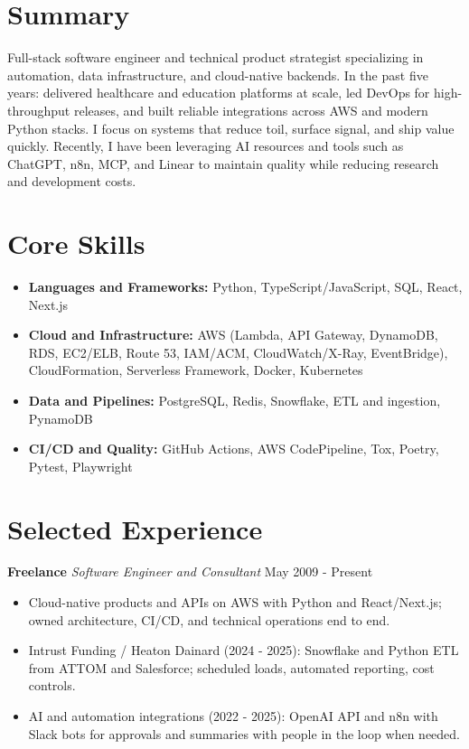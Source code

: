 \documentclass[10pt]{article}
\begin{document}
\section*{Summary}
Full-stack software engineer and technical product strategist specializing in automation, data infrastructure, and cloud-native backends. In the past five years: delivered healthcare and education platforms at scale, led DevOps for high-throughput releases, and built reliable integrations across AWS and modern Python stacks. I focus on systems that reduce toil, surface signal, and ship value quickly. Recently, I have been leveraging AI resources and tools such as ChatGPT, n8n, MCP, and Linear to maintain quality while reducing research and development costs.

\section*{Core Skills}
\begin{itemize}[leftmargin=*]
  \item \textbf{Languages and Frameworks:} Python, TypeScript/JavaScript, SQL, React, Next.js
  \item \textbf{Cloud and Infrastructure:} AWS (Lambda, API Gateway, DynamoDB, RDS, EC2/ELB, Route 53, IAM/ACM, CloudWatch/X-Ray, EventBridge), CloudFormation, Serverless Framework, Docker, Kubernetes
  \item \textbf{Data and Pipelines:} PostgreSQL, Redis, Snowflake, ETL and ingestion, PynamoDB
  \item \textbf{CI/CD and Quality:} GitHub Actions, AWS CodePipeline, Tox, Poetry, Pytest, Playwright
\end{itemize}

\section*{Selected Experience}
\noindent\textbf{Freelance} \textit{Software Engineer and Consultant} \hfill May 2009 - Present\par
\begin{itemize}
  \item Cloud-native products and APIs on AWS with Python and React/Next.js; owned architecture, CI/CD, and technical operations end to end.
  \item Intrust Funding / Heaton Dainard (2024 - 2025): Snowflake and Python ETL from ATTOM and Salesforce; scheduled loads, automated reporting, cost controls.
  \item AI and automation integrations (2022 - 2025): OpenAI API and n8n with Slack bots for approvals and summaries with people in the loop when needed.
\end{itemize}
\end{document}
